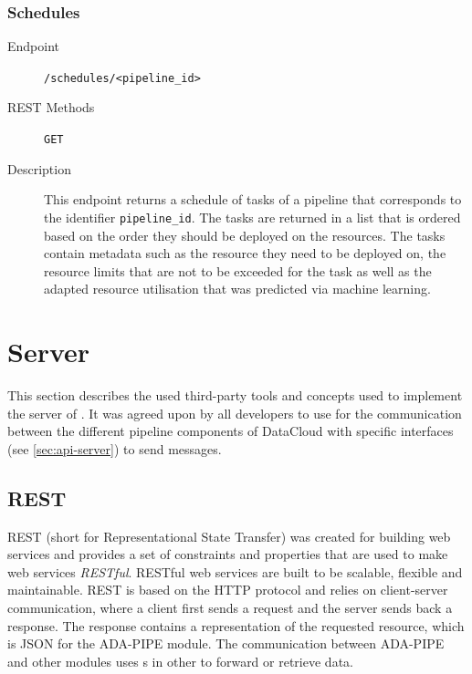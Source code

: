\documentclass{article}
\begin{document}
            \subsubsection{Schedules}

            \begin{description}
                \item[Endpoint] \texttt{/schedules/<pipeline\_id>}
                \item[REST Methods] \texttt{GET}
                \item[Description] This endpoint returns a schedule of tasks of a pipeline that corresponds to the identifier \texttt{pipeline\_id}. The tasks are returned in a list that is ordered based on the order they should be deployed on the resources. The tasks contain metadata such as the resource they need to be deployed on, the resource limits that are not to be exceeded for the task as well as the adapted resource utilisation that was predicted via machine learning.
            \end{description}

    \section{Server}
    \label{sec:server}

        This section describes the used third-party tools and concepts used to implement the server of .
        It was agreed upon by all developers to use  for the communication between the different pipeline components of DataCloud with specific interfaces (see \ref{sec:api-server}) to send messages.

        \subsection{REST}
        \label{sec:rest-server}

            REST \cite{redhatWhatRESTAPI} (short for Representational State Transfer) was created for building web services and provides a set of constraints and properties
            that are used to make web services \emph{RESTful}. RESTful web services are built to be scalable, flexible and maintainable.
            REST is based on the HTTP protocol and relies on client-server communication, where a client first sends a request and the server sends back a response.
            The response contains a representation of the requested resource, which is JSON for the ADA-PIPE module.
            The communication between ADA-PIPE and other modules uses s in other to forward or retrieve data.
\end{document}

